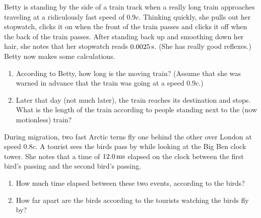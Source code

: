 \begin{problem}
Betty is standing by the side of a train track when a really
long train approaches traveling at a ridiculously fast speed of $0.9c$.
Thinking quickly, she pulls out her stopwatch, clicks it on when the
front of the train passes and clicks it off when the back of the train
passes.  After standing back up and smoothing down her hair, she notes
that her stopwatch reads $0.0025\,\mbox{s}$.  (She has really good reflexes.)
Betty now makes some calculations.
    \begin{enumerate}
    \item According to Betty, how long is the moving train?  (Assume
     that she was warned in advance that the train was going at a
     speed $0.9c$.)
     \item Later that day (not much later), the train reaches its
     destination and stops.  What is the length of the train according
     to people standing next to the (now motionless) train?
     \end{enumerate}
\end{problem}

\begin{problem}
During migration, two fast Arctic terns fly one behind the other
over London at speed $0.8 c$.
A tourist  sees the birds pass by while looking at the Big Ben clock tower.
She notes that
a time of $12.0\,\mbox{ms}$ elapsed on the clock between the first 
bird's passing and the second bird's passing.
    \begin{enumerate}
    \item How much time elapsed between these two events, according to
    the birds?
    \item How far apart are the birds according to the tourists watching the
birds fly by?  
    \end{enumerate}
\label{prob:terns}
\end{problem}

